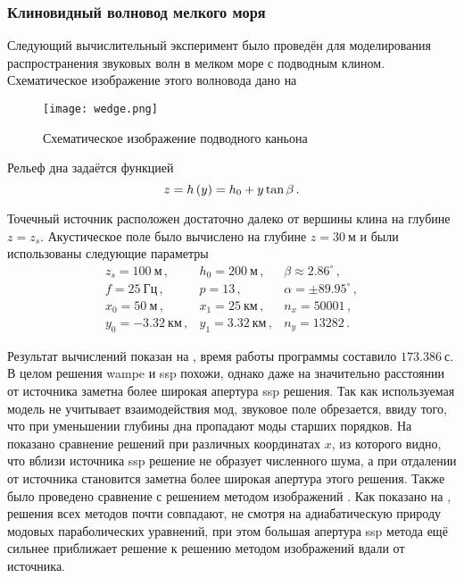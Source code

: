 \documentclass[../document.tex]{subfiles}
\begin{document}
            \subsubsection{Клиновидный волновод мелкого моря}
                \par Следующий вычислительный эксперимент было проведён для моделирования распространения звуковых волн в мелком море с подводным клином. Схематическое изображение этого волновода дано на
                \begin{figure}[h]
                    \centering
                    \texttt{[image: wedge.png]}
                    \caption{Схематическое изображение подводного каньона\label{fig::wedge}}
                \end{figure}
                Рельеф дна задаётся функцией
                \begin{equation}
                    z=h\left(y\right)=h_0+y\tan\beta\,.
                \end{equation}
                \par Точечный источник расположен достаточно далеко от вершины клина на глубине $z=z_s$. Акустическое поле было вычислено на глубине $z=30\ \text{м}$ и были использованы следующие параметры
                \begin{equation}
                    \begin{array}{ccc}
                        z_s=100\ \text{м}\,,&h_0=200\ \text{м}\,,&\beta\approx2.86^\circ\,,\\
                       f=25\ \text{Гц}\,,&p=13\,,&\alpha=\pm89.95^\circ\,,\\
                       x_0=50\ \text{м}\,,&x_1=25\ \text{км}\,,&n_x=50001\,,\\
                       y_0=-3.32\ \text{км}\,,&y_1=3.32\ \text{км}\,,&n_y=13282\,.
                    \end{array}
                \end{equation}
                \par Результат вычислений показан на , время работы программы составило $173.386\ \text{с}$. В целом решения \acrshort{wampe} и \acrshort{ssp} похожи, однако даже на значительно расстоянии от источника заметна более широкая апертура \acrshort{ssp} решения. Так как используемая модель не учитывает взаимодействия мод, звуковое поле обрезается, ввиду того, что при уменьшении глубины дна пропадают моды старших порядков. На  показано сравнение решений при различных координатах $x$, из которого видно, что вблизи источника \acrshort{ssp} решение не образует численного шума, а при отдалении от источника становится заметна более широкая апертура этого решения. Также было проведено сравнение с решением методом изображений \cite{deane,tang}. Как показано на , решения всех методов почти совпадают, не смотря на адиабатическую природу модовых параболических уравнений, при этом большая апертура \acrshort{ssp} метода ещё сильнее приближает решение к решению методом изображений вдали от источника.
\end{document}
